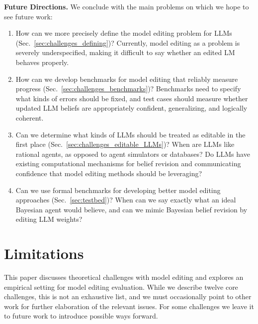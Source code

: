 \documentclass[11pt,a4paper]{article}
\begin{document}
\vspace{6pt}
\noindent \textbf{Future Directions.} We conclude with the main problems on which we hope to see future work:
\vspace{-3pt}
\begin{enumerate}[leftmargin=12pt, itemsep=-2pt]
\item How can we more precisely define the model editing problem for LLMs (Sec.~\ref{sec:challenges_defining})? Currently, model editing as a problem is severely underspecified, making it difficult to say whether an edited LM behaves properly.
\item How can we develop benchmarks for model editing that reliably measure progress (Sec.~\ref{sec:challenges_benchmarks})? Benchmarks need to specify what kinds of errors should be fixed, and test cases should measure whether updated LLM beliefs are appropriately confident, generalizing, and logically coherent. 
\item Can we determine what kinds of LLMs should be treated as editable in the first place (Sec.~\ref{sec:challenges_editable_LLMs})? When are LLMs like rational agents, as opposed to agent simulators or databases? Do LLMs have existing computational mechanisms for belief revision and communicating confidence that model editing methods should be leveraging? 
\item Can we use formal benchmarks for developing better model editing approaches (Sec.~\ref{sec:testbed})? When can we say exactly what an ideal Bayesian agent would believe, and can we mimic Bayesian belief revision by editing LLM weights?
\end{enumerate}

\section*{Limitations}
This paper discusses theoretical challenges with model editing and explores an empirical setting for model editing evaluation. While we describe twelve core challenges, this is not an exhaustive list, and we must occasionally point to other work for further elaboration of the relevant issues. For some challenges we leave it to future work to introduce possible ways forward.
\end{document}
